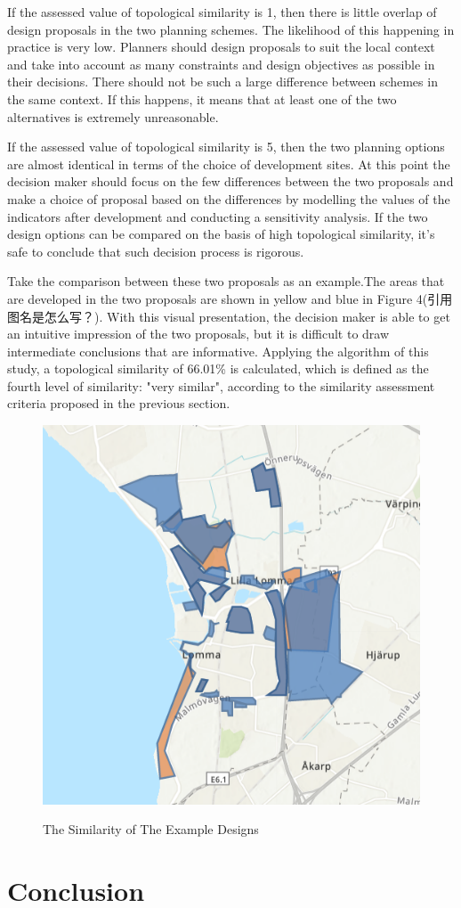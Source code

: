 If the assessed value of topological similarity is 1, then there is little overlap of design proposals in the two planning schemes. The likelihood of this happening in practice is very low. Planners should design proposals to suit the local context and take into account as many constraints and design objectives as possible in their decisions. There should not be such a large difference between schemes in the same context. If this happens, it means that at least one of the two alternatives is extremely unreasonable.

If the assessed value of topological similarity is 5, then the two planning options are almost identical in terms of the choice of development sites. At this point the decision maker should focus on the few differences between the two proposals and make a choice of proposal based on the differences by modelling the values of the indicators after development and conducting a sensitivity analysis. If the two design options can be compared on the basis of high topological similarity, it's safe to conclude that such decision process is rigorous.

Take the comparison between these two proposals as an example.The areas that are developed in the two proposals are shown in yellow and blue in Figure 4(引用图名是怎么写？). With this visual presentation, the decision maker is able to get an intuitive impression of the two proposals, but it is difficult to draw intermediate conclusions that are informative. Applying the algorithm of this study, a topological similarity of 66.01\% is calculated, which is defined as the fourth level of similarity: "very similar", according to the similarity assessment criteria proposed in the previous section.

\begin{figure}[H]
\caption{The Similarity of The Example Designs}
\centering
\includegraphics[scale=0.5]{pic4.png}
\label{fig:label}
\end{figure}

\section*{Conclusion}







